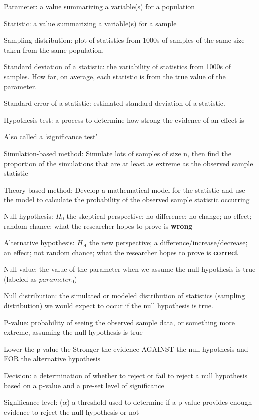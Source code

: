 \documentclass[
]{report}
\newcommand{\rgi}{\hspace{24pt}}  %
\begin{document}
Parameter: a value summarizing a variable(s) for a population

Statistic: a value summarizing a variable(s) for a sample

Sampling distribution: plot of statistics from 1000s of samples of the same size taken from the same population.

Standard deviation of a statistic: the variability of statistics from 1000s of samples. How far, on average, each statistic is from the true value of the parameter.

Standard error of a statistic: estimated standard deviation of a statistic.

Hypothesis test: a process to determine how strong the evidence of an effect is

\rgi Also called a `significance test'

Simulation-based method: Simulate lots of samples of size n, then find the proportion of the simulations that are at least as extreme as the observed sample statistic

Theory-based method: Develop a mathematical model for the statistic and use the model to calculate the probability of the observed sample statistic occurring

Null hypothesis: \(H_0\) the skeptical perspective; no difference; no change; no effect; random chance; what the researcher hopes to prove is \textbf{wrong}

Alternative hypothesis: \(H_A\) the new perspective; a difference/increase/decrease; an effect; not random chance; what the researcher hopes to prove is \textbf{correct}

Null value: the value of the parameter when we assume the null hypothesis is true (labeled as \(parameter_0\))

Null distribution: the simulated or modeled distribution of statistics (sampling distribution) we would expect to occur if the null hypothesis is true.

P-value: probability of seeing the observed sample data, or something more extreme, assuming the null hypothesis is true

\rgi Lower the p-value the Stronger the evidence AGAINST the null hypothesis and FOR the alternative hypothesis

Decision: a determination of whether to reject or fail to reject a null hypothesis based on a p-value and a pre-set level of significance

Significance level: (\(\alpha\)) a threshold used to determine if a p-value provides enough evidence to reject the null hypothesis or not
\end{document}
